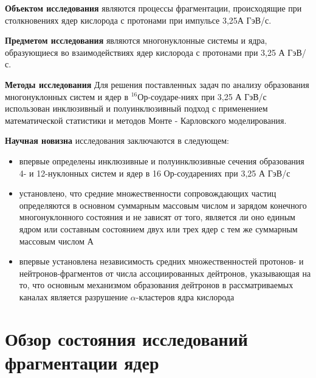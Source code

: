 \documentclass[fontsize=14pt]{scrreport}
\begin{document}
\textbf{Объектом исследования} являются процессы фрагментации, происходящие при столкновениях ядер кислорода с протонами при импульсе 3,25А ГэВ/с.

\textbf{Предметом исследования}  являются многонуклонные системы и ядра, образующиеся во взаимодействиях ядер кислорода с протонами при 3,25 А ГэВ/с.

\textbf{Методы исследования} Для решения поставленных задач по анализу образования многонуклонных систем и ядер в $^{16}$Ор-соударе-ниях при 3,25 А ГэВ/с использован инклюзивный и полуинклюзивный подход с применением математической статистики и методов Монте - Карловского моделирования. 

\textbf{Научная новизна} исследования заключаются в следующем:
\begin{itemize}
    \item впервые определены инклюзивные и полуинклюзивные сечения
образования 4- и 12-нуклонных систем и ядер в 16 Ор-соударениях при 3,25 А ГэВ/с
    \item установлено, что средние множественности сопровождающих частиц определяются в основном суммарным массовым числом и зарядом конечного многонуклонного состояния и не зависят от того, является ли оно единым ядром или составным состоянием двух или трех ядер с тем же суммарным массовым числом А
    \item впервые установлена независимость средних множественностей протонов- и нейтронов-фрагментов от числа ассоциированных дейтронов, указывающая на то, что основным механизмом образования дейтронов в рассматриваемых каналах является разрушение $\alpha$-кластеров ядра кислорода
\end{itemize}

\chapter{Обзор состояния  исследований фрагментации ядер}	
\end{document}
